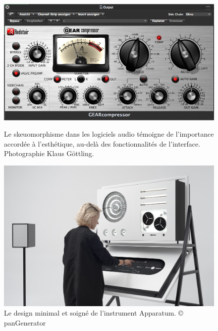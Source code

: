 \begin{figure}[!htbp]
	\captionsetup{format=plain}%
	\centering
	\begin{minipage}[t]{0.48\textwidth}
		\includegraphics[width=\linewidth]{gfx/06_visual_representation/Redstair_GEARcompressor.png}
		\caption[Skeuomorphisme dans les logiciels audio]{Le skeuomorphisme dans les logiciels audio témoigne de l'importance accordée à l'esthétique, au-delà des fonctionnalités de l'interface. Photographie Klaus Göttling.}
		\label{fig:visual_representation:skeuomorphisme}
	\end{minipage}
	\hspace{.02\linewidth}
	\begin{minipage}[t]{0.48\textwidth}
	    \includegraphics[width=\linewidth]{gfx/06_visual_representation/2018_06_26_PAN_GENERATOR_APPARATUM0396.jpg}
		\caption[Apparatum, par panGenerator]{Le design minimal et soigné de l'instrument Apparatum. © panGenerator}
		\label{fig:visual_representation:apparatum}
	\end{minipage}
\end{figure}

